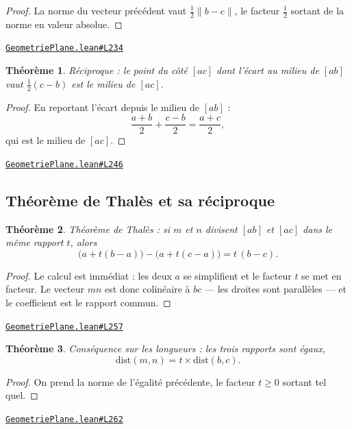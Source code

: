 \documentclass[11pt,a4paper]{article}
\theoremstyle{definition}
\theoremstyle{plain}
\newtheorem{theoreme}{Théorème}
\newcommand{\source}[2]{\par\smallskip\noindent\hfill{\footnotesize\href{#1}{\texttt{#2}}}\par\smallskip}
\begin{document}
\begin{proof}
La norme du vecteur précédent vaut $\tfrac12\|b - c\|$, le facteur $\tfrac12$ sortant de
la norme en valeur absolue.
\end{proof}
\source{https://github.com/Commutator-IO/learn-lean/blob/main/cours/01-college/02-geometrie-plane/GeometriePlane.lean\#L234}{GeometriePlane.lean\#L234}

\begin{theoreme}
Réciproque : le point du côté $[ac]$ dont l'écart au milieu de $[ab]$ vaut
$\tfrac12(c-b)$ est le milieu de $[ac]$.
\end{theoreme}

\begin{proof}
En reportant l'écart depuis le milieu de $[ab]$ :
\[ \frac{a+b}{2} + \frac{c-b}{2} = \frac{a+c}{2} , \]
qui est le milieu de $[ac]$.
\end{proof}
\source{https://github.com/Commutator-IO/learn-lean/blob/main/cours/01-college/02-geometrie-plane/GeometriePlane.lean\#L246}{GeometriePlane.lean\#L246}

\subsection{Théorème de Thalès et sa réciproque}

\begin{theoreme}
Théorème de Thalès : si $m$ et $n$ divisent $[ab]$ et $[ac]$ dans le même rapport $t$,
alors
\[ \bigl(a + t(b-a)\bigr) - \bigl(a + t(c-a)\bigr) = t\,(b - c) . \]
\end{theoreme}

\begin{proof}
Le calcul est immédiat : les deux $a$ se simplifient et le facteur $t$ se met en
facteur. Le vecteur $mn$ est donc colinéaire à $bc$ — les droites sont parallèles — et le
coefficient est le rapport commun.
\end{proof}
\source{https://github.com/Commutator-IO/learn-lean/blob/main/cours/01-college/02-geometrie-plane/GeometriePlane.lean\#L257}{GeometriePlane.lean\#L257}

\begin{theoreme}
Conséquence sur les longueurs : les trois rapports sont égaux,
\[ \mathrm{dist}(m, n) = t \times \mathrm{dist}(b, c) . \]
\end{theoreme}

\begin{proof}
On prend la norme de l'égalité précédente, le facteur $t \ge 0$ sortant tel quel.
\end{proof}
\source{https://github.com/Commutator-IO/learn-lean/blob/main/cours/01-college/02-geometrie-plane/GeometriePlane.lean\#L262}{GeometriePlane.lean\#L262}
\end{document}
